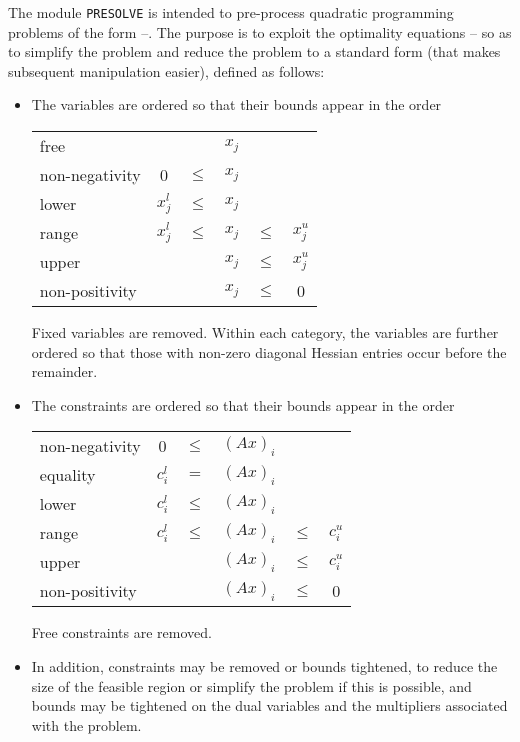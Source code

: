 \documentclass[twoside]{article}
\begin{document}
The module {\tt PRESOLVE} is intended to pre-process
quadratic programming problems of the form --.
The purpose is to exploit the 
optimality equations -- so as to simplify the problem
and reduce the problem to a standard form (that makes subsequent 
manipulation easier), defined as follows: 
\begin{itemize}
\item The variables are ordered so that their bounds appear in the order
\begin{center}
\begin{tabular}{lccccc}
free                &          &        & $x_j$ &        &          \\
non-negativity      &   0      & $\leq$ & $x_j$ &        &          \\
lower               & $x^l_j$ & $\leq$ & $x_j$ &        &          \\
range               & $x^l_j$ & $\leq$ & $x_j$ & $\leq$ & $x^u_j$ \\
upper               &          &        & $x_j$ & $\leq$ & $x^u_j$ \\
non-positivity      &          &        & $x_j$ & $\leq$ &      0   \\
\end{tabular}
\end{center}

Fixed variables are removed. Within each category, the variables 
are further ordered so that those with non-zero diagonal Hessian 
entries occur before the remainder.

\item
The constraints are ordered so that their bounds appear in the order
\begin{center}
\begin{tabular}{lccccc}
non-negativity      &     0    & $\leq$ & $( A x)_i$ &        &          \\
equality            & $c^l_i$ &   $=$  & $(A x)_i$ &        &          \\
lower               & $c^l_i$ & $\leq$ & $(A x)_i$ &        &          \\
range               & $c^l_i$ & $\leq$ & $(A x)_i$ & $\leq$ & $c^u_i$ \\
upper               &          &        & $(A x)_i$ & $\leq$ & $c^u_i$ \\
non-positivity      &          &        & $(A x)_i$ & $\leq$ &     0    \\
\end{tabular}
\end{center}
Free constraints are removed. 

\item
In addition, constraints may be removed or bounds tightened, to reduce the
size of the feasible region or simplify the problem if this is possible, and
bounds may be tightened on the dual variables and the multipliers 
associated  with the problem. 
\end{itemize}
\end{document}
